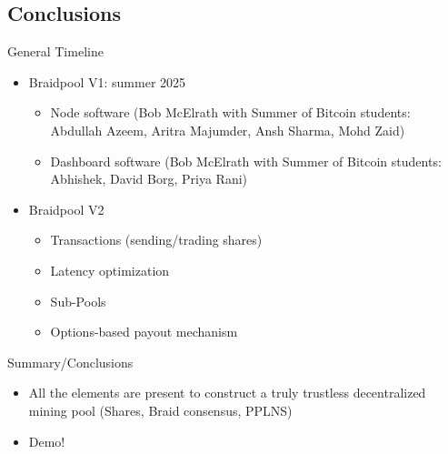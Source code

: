 \documentclass[tikz,mathserif,usenames,dvipsnames,svgnames,table]{beamer}
\newlength{\wideitemsep}
\newlength{\narrowitemsep}
\let\olditem\item
\renewcommand{\item}{\setlength{\itemsep}{\wideitemsep}\olditem}
\newcommand{\nitem}{\setlength{\itemsep}{\narrowitemsep}\olditem}
\begin{document}
\subsection{Conclusions}
\begin{frame}{General Timeline}
    \begin{itemize}
        \item Braidpool V1: summer 2025
            \begin{itemize}
                \item Node software (Bob McElrath with Summer of Bitcoin students:
                    Abdullah Azeem, Aritra Majumder, Ansh Sharma, Mohd Zaid)
                \item Dashboard software (Bob McElrath with Summer of Bitcoin students:
                    Abhishek, David Borg, Priya Rani)
            \end{itemize}
        \item Braidpool V2
            \begin{itemize}
                \item Transactions (sending/trading shares)
                \item Latency optimization
                \item Sub-Pools
                \item Options-based payout mechanism
            \end{itemize}
    \end{itemize}
\end{frame}
\begin{frame}{Summary/Conclusions}
    \begin{itemize}
        \item All the elements are present to construct a truly trustless decentralized
            mining pool (Shares, Braid consensus, PPLNS)
        \item Demo!
    \end{itemize}
\end{frame}
\end{document}
